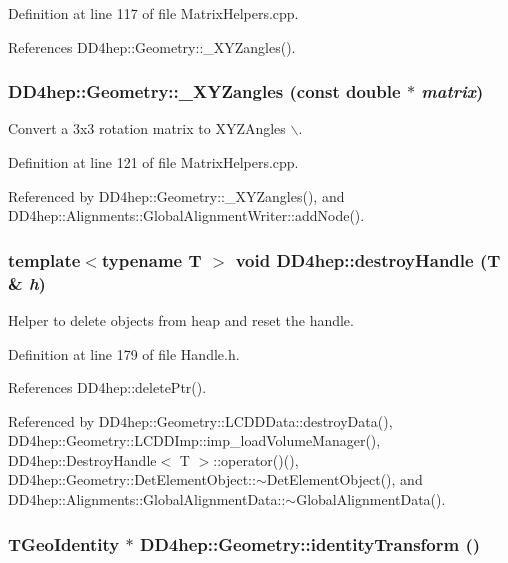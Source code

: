 Definition at line 117 of file MatrixHelpers.cpp.

References DD4hep::Geometry::\_\-XYZangles().\hypertarget{group___d_d4_h_e_p___g_e_o_m_e_t_r_y_ga446608ca1668ae2b3ad24c3ea5b2bc1e}{
\subsubsection[{\_\-XYZangles}]{ DD4hep::Geometry::\_\-XYZangles (const double $\ast$ {\em matrix})}}
\label{group___d_d4_h_e_p___g_e_o_m_e_t_r_y_ga446608ca1668ae2b3ad24c3ea5b2bc1e}


Convert a 3x3 rotation matrix to XYZAngles $\backslash$. 

Definition at line 121 of file MatrixHelpers.cpp.

Referenced by DD4hep::Geometry::\_\-XYZangles(), and DD4hep::Alignments::GlobalAlignmentWriter::addNode().\hypertarget{group___d_d4_h_e_p___g_e_o_m_e_t_r_y_ga613cd8eaf766f07c2abb80e73e618397}{
\subsubsection[{destroyHandle}]{\setlength{\rightskip}{0pt plus 5cm}template$<$typename T $>$ void DD4hep::destroyHandle ({\bf T} \& {\em h})}}
\label{group___d_d4_h_e_p___g_e_o_m_e_t_r_y_ga613cd8eaf766f07c2abb80e73e618397}


Helper to delete objects from heap and reset the handle. 

Definition at line 179 of file Handle.h.

References DD4hep::deletePtr().

Referenced by DD4hep::Geometry::LCDDData::destroyData(), DD4hep::Geometry::LCDDImp::imp\_\-loadVolumeManager(), DD4hep::DestroyHandle$<$ T $>$::operator()(), DD4hep::Geometry::DetElementObject::$\sim$DetElementObject(), and DD4hep::Alignments::GlobalAlignmentData::$\sim$GlobalAlignmentData().\hypertarget{group___d_d4_h_e_p___g_e_o_m_e_t_r_y_gacb7266110e19d4dda6cc6b2ebc57bd39}{
\subsubsection[{identityTransform}]{\setlength{\rightskip}{0pt plus 5cm}TGeoIdentity $\ast$ DD4hep::Geometry::identityTransform ()}}
\label{group___d_d4_h_e_p___g_e_o_m_e_t_r_y_gacb7266110e19d4dda6cc6b2ebc57bd39}


